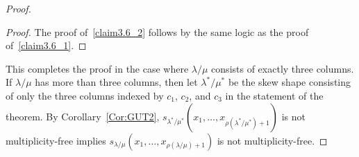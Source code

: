 \begin{proof}
\begin{proof}
The proof of~\ref{claim3.6_2} follows by the same logic as the proof of~\ref{claim3.6_1}.
\end{proof}

This completes the proof in the case where $\lambda/\mu$ consists of exactly three columns. If $\lambda/\mu$ has more than three columns, then let $\lambda^*/\mu^*$ be the skew shape consisting of only the three columns indexed by $c_1$, $c_2$, and $c_3$ in the statement of the theorem. By Corollary~\ref{Cor:GUT2}, $s_{\lambda^*/\mu^*}(x_1,\dots, x_{\rho(\lambda^*/\mu^*) + 1})$ is not multiplicity-free implies $s_{\lambda/\mu}(x_1,\dots, x_{\rho(\lambda/\mu) + 1})$ is not multiplicity-free.
\end{proof}

